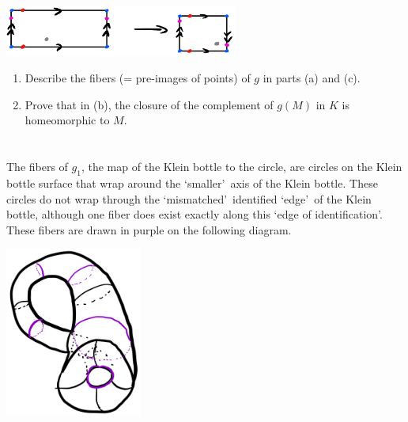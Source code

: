 \documentclass{jhwhw}
\begin{document}
\part{}%
\begin{center}
	\includegraphics[height=0.65in]{5_3c.png}
\end{center}


\problem{}%
\begin{enumerate}
	\item Describe the fibers (= pre-images of points) of $g$  in parts (a) and (c).
	\item Prove that in (b),  the closure of the complement of $g(M)$ in $K$  is homeomorphic to $M$.
	
\end{enumerate}
\solution{}
\part{}%
\noindent
The fibers of $g_1$, the map of the Klein bottle to the circle, are circles on the Klein bottle surface that wrap around the \lq smaller\rq\ axis of the Klein bottle. These circles do not wrap through the \lq mismatched\rq\ identified \lq edge\rq\ of the Klein bottle, although one fiber does exist exactly along this \lq edge of identification\rq. These fibers are drawn in purple on the following diagram.
\begin{center}
	\includegraphics[height=2.2in]{5_4a1.png}
\end{center}
\end{document}
